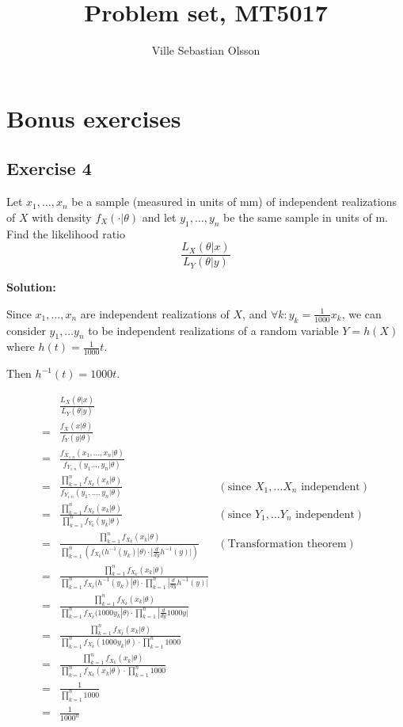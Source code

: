 \documentclass{article}
\title{Problem set, MT5017}
\author{Ville Sebastian Olsson}
\begin{document}
\maketitle
\tableofcontents

\section{Bonus exercises}
\subsection{Exercise 4}

Let \(x_1,\ldots,x_n\) be a sample (measured in units of mm) of independent
realizations of \(X\) with density \(f_X(\cdot |\theta)\) and let \(y_1, \ldots , y_n\) be the same sample in units of m. Find the likelihood ratio
\[\frac{L_X(\theta|x)}{L_Y(\theta|y)}\]

\textbf{Solution:}

Since \(x_1,\ldots,x_n\) are independent realizations of \(X\), and \(\forall k: y_k=\frac{1}{1000}x_k\), we can consider \(y_1,\ldots y_n\) to be independent realizations of a random variable \(Y=h(X)\) where
\(h(t)=\frac{1}{1000}t\).

Then \(h^{-1}(t) = 1000t\).

\begin{align*}
     & \frac{L_X(\theta|x)}{L_Y(\theta|y)} \\
    =& \frac{f_X(x|\theta)}{f_Y(y|\theta)} \\
    =& \frac{f_{X_{1:n}}(x_1,\ldots, x_n|\theta)}{f_{Y_{1:n}}(y_1\ldots, y_n|\theta)} \\
    =& \frac{\prod_{k=1}^n f_{X_k}(x_k|\theta)}{f_{Y_{1:n}}(y_1,\ldots,y_n|\theta)} & (\text{since }X_1,\ldots X_n\text{ independent}) \\
    =& \frac{\prod_{k=1}^n f_{X_k}(x_k|\theta)}{\prod_{k=1}^n f_{Y_k}(y_k|\theta)} & (\text{since }Y_1,\ldots Y_n\text{ independent}) \\
    =& \frac{\prod_{k=1}^n f_{X_k}(x_k|\theta)}{\prod_{k=1}^n \left( f_{X_k}(h^{-1}(y_k)|\theta) \cdot |\frac{d}{dy}h^{-1}(y)| \right)} & (\text{Transformation theorem}) \\
    =& \frac{\prod_{k=1}^n f_{X_k}(x_k|\theta)}{\prod_{k=1}^n f_{X_k}(h^{-1}(y_k)|\theta) \cdot \prod_{k=1}^n |\frac{d}{dy}h^{-1}(y)|} \\
    =& \frac{\prod_{k=1}^n f_{X_k}(x_k|\theta)}{\prod_{k=1}^n f_{X_k}(1000y_k|\theta) \cdot \prod_{k=1}^n |\frac{d}{dy}1000y|} \\
    =& \frac{\prod_{k=1}^n f_{X_k}(x_k|\theta)}{\prod_{k=1}^n f_{X_k}(1000y_k|\theta) \cdot \prod_{k=1}^n 1000} \\
    =& \frac{\prod_{k=1}^n f_{X_k}(x_k|\theta)}{\prod_{k=1}^n f_{X_k}(x_k|\theta) \cdot \prod_{k=1}^n 1000} \\
    =& \frac{1}{\prod_{k=1}^n 1000} \\
    =& \frac{1}{1000^n} \\
\end{align*}
\end{document}
